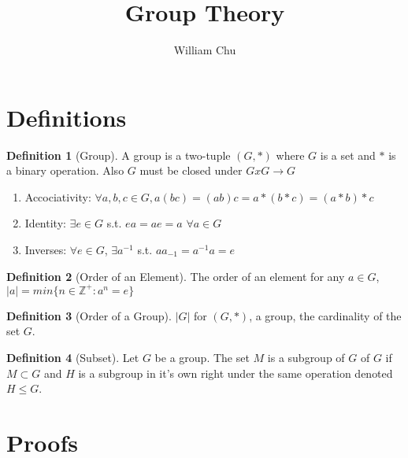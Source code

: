 \documentclass{article}
\theoremstyle{definition}
\newtheorem{definition}{Definition}[section]
\begin{document}
 

\title{Group Theory} 
\author{William Chu} 
\maketitle 

\section{Definitions}

\begin{definition}[Group]
A group is a two-tuple $(G,*)$ where $G$ is a set and $*$ is a binary operation. Also $G$ must be closed under $GxG\rightarrow G$
	\begin{enumerate}
		\item Accociativity: $\forall a,b,c \in G, a(bc) = (ab)c=a*(b*c)=(a*b)*c$
		\item Identity: $\exists e \in G$ s.t. $ea=ae=a$ $\forall a \in G$
		\item Inverses: $\forall e \in G$, $\exists a^{-1}$ s.t. $aa_{-1}= a^{-1}a =e$
	\end{enumerate}
\end{definition} 

\begin{definition}[Order of an Element]
The order of an element for any $a \in G$, $|a| = min\{n\in \mathbb{Z}^+: a^n=e\}$
\end{definition}

\begin{definition}[Order of a Group]
$|G|$ for $(G,*)$, a group, the cardinality of the set $G$.
\end{definition}

\begin{definition}[Subset]
Let $G$ be a group. The set $M$ is a subgroup of $G$ of $G$ if $M\subset G$ and $H$ is a subgroup in it's own right under the same operation denoted $H \leq G$.
\end{definition}

\section{Proofs}
\end{document}
